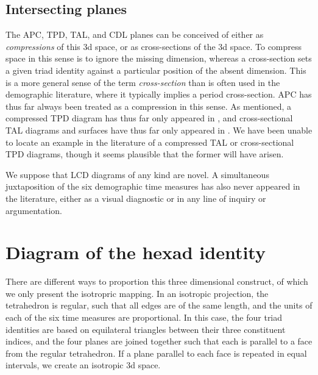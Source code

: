 \documentclass[12pt,oneside,a4paper]{article} %
\begin{document}
\subsection{Intersecting planes}

The APC, TPD, TAL, and CDL planes can be conceived of either as
\textit{compressions} of this 3d space, or as cross-sections of the 3d space. To
compress space in this sense is to ignore the missing dimension,
whereas a cross-section sets a given triad identity against a particular
position of the absent dimension. This is a more general sense of the term
\textit{cross-section} than is often used in the demographic literature, where
it typically implies a period cross-section.
APC has thus far always been treated as a compression in this sense.
As mentioned, a compressed TPD diagram has thus far only appeared
in \citet{pancho2015}, and cross-sectional TAL diagrams and surfaces have thus
far only appeared in \citet{riffe2015ttd}. 
We have been unable to locate an example in the literature of a compressed
TAL or cross-sectional TPD diagrams, though it seems plausible that the former
will have arisen. 

We suppose
that LCD diagrams of any kind are novel. A simultaneous juxtaposition of
the six demographic time measures has also never appeared in the literature, either as a visual diagnostic or in any line of
inquiry or argumentation.

 \section{Diagram of the hexad identity}
 There are different ways to proportion this three dimensional construct,
of which we only present the isotropric mapping. In an isotropic projection, the
tetrahedron is regular, such that all edges are of the same length, and the
units of each of the six time measures are proportional. In this case, the four triad identities are based on equilateral triangles between their three constituent indices, and the four planes are joined together such that each is parallel to a face from the regular
tetrahedron. If a plane parallel to each face is repeated in equal
intervals, we create an isotropic 3d space.
\end{document}
